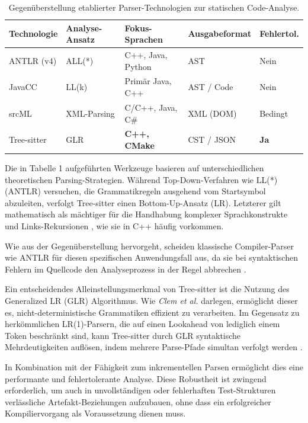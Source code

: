 \documentclass[12pt,titlepage]{article}
\begin{document}
\begin{table}[H]
    \centering
    \label{tab:parser_vergleich}
    \begin{tabularx}{\linewidth}{lllll}
        \toprule
        \textbf{Technologie} & \textbf{Analyse-Ansatz} & \textbf{Fokus-Sprachen} & \textbf{Ausgabeformat} & \textbf{Fehlertol.} \\
        \midrule
        ANTLR (v4)\cite{Comparison_Parsers}  & ALL(*)      & C++, Java, Python  & AST          & Nein \\
        JavaCC\cite{Comparison_Parsers}      & LL(k)       & Primär Java, C++   & AST / Code   & Nein \\
        srcML\cite{srcML}       & XML-Parsing & C/C++, Java, C\#   & XML (DOM)    & Bedingt \\
        Tree-sitter\cite{treesitter, Comparison_Parsers} & GLR         & \textbf{C++, CMake}& CST / JSON   & \textbf{Ja} \\
        \bottomrule
    \end{tabularx}
    \caption{Gegenüberstellung etablierter Parser-Technologien zur statischen Code-Analyse.}
\end{table}
Die in Tabelle 1 aufgeführten Werkzeuge basieren auf unterschiedlichen theoretischen Parsing-Strategien. Während Top-Down-Verfahren wie LL(*) (ANTLR) versuchen, die Grammatikregeln ausgehend vom Startsymbol abzuleiten, verfolgt Tree-sitter einen Bottom-Up-Ansatz (LR)\cite[S.~212, 233-234]{Aho_Lam_Sethi_Ullman_2007}. Letzterer gilt mathematisch als mächtiger für die Handhabung komplexer Sprachkonstrukte 
und Links-Rekursionen \cite[S.~234]{Aho_Lam_Sethi_Ullman_2007}, wie sie in C++ häufig vorkommen.

Wie aus der Gegenüberstellung hervorgeht, scheiden klassische Compiler-Parser wie ANTLR für diesen spezifischen Anwendungsfall aus, da sie bei syntaktischen Fehlern im Quellcode den Analyseprozess in der Regel abbrechen \cite{Comparison_Parsers}.

Ein entscheidendes Alleinstellungsmerkmal von Tree-sitter ist die Nutzung des Generalized LR (GLR) Algorithmus. Wie \textit{Clem et al.} \cite{SAGitHub} darlegen, ermöglicht dieser es, nicht-deterministische Grammatiken effizient zu verarbeiten. Im Gegensatz zu herkömmlichen LR(1)-Parsern, die auf einen Lookahead von lediglich einem Token beschränkt sind, kann Tree-sitter durch GLR syntaktische Mehrdeutigkeiten auflösen, indem mehrere Parse-Pfade simultan verfolgt werden \cite{treesitter}.

\noindent In Kombination mit der Fähigkeit zum inkrementellen Parsen ermöglicht dies eine performante und fehlertolerante Analyse. Diese Robustheit ist zwingend erforderlich, um auch in unvollständigen oder fehlerhaften Test-Strukturen verlässliche Artefakt-Beziehungen aufzubauen, ohne dass ein erfolgreicher Kompiliervorgang als Voraussetzung dienen muss.
\end{document}

